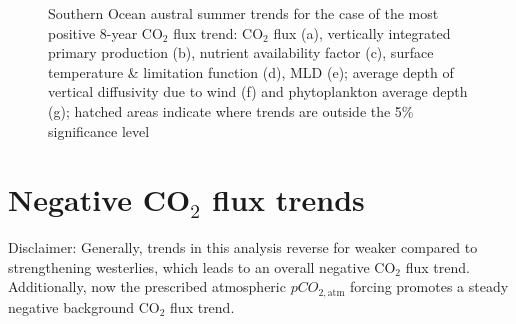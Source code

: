 \begin{figure}[h!] %

	\caption{Southern Ocean austral summer trends for the case of the most positive 8-year CO$_2$ flux trend: CO$_2$ flux (a), vertically integrated primary production (b), nutrient availability factor (c), surface temperature \& limitation function (d), \ac{MLD} (e); average depth of vertical diffusivity due to wind (f) and phytoplankton average depth (g); hatched areas indicate where trends are outside the 5\% significance level}
	\label{fig:summer_trends_pos}
\end{figure}



\clearpage



\section{Negative CO$_2$ flux trends}
\label{sec:trends_neg}

Disclaimer: Generally, trends in this analysis reverse for weaker compared to strengthening westerlies, which leads to an overall negative CO$_2$ flux trend. Additionally, now the prescribed atmospheric $pCO_{2,\text{atm}}$ forcing promotes a steady negative background CO$_2$ flux trend.\newline

